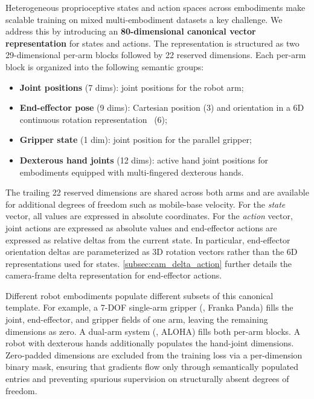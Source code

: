 Heterogeneous proprioceptive states and action spaces across embodiments make scalable training on mixed multi-embodiment datasets a key challenge.
We address this by introducing an \textbf{80-dimensional canonical vector representation} for states and actions.  
The representation is structured as two 29-dimensional per-arm blocks followed by 22 reserved dimensions.
Each per-arm block is organized into the following semantic groups:
\begin{itemize}[leftmargin=*,topsep=2pt,itemsep=1pt]
    \item \textbf{Joint positions} (7 dims): joint positions for the robot arm;
    \item \textbf{End-effector pose} (9 dims): Cartesian position (3) and orientation in a 6D continuous rotation representation~\citep{zhou2019continuity} (6);
    \item \textbf{Gripper state} (1 dim): joint position for the parallel gripper;
    \item \textbf{Dexterous hand joints} (12 dims): active hand joint positions for embodiments equipped with multi-fingered dexterous hands.
\end{itemize}
The trailing 22 reserved dimensions are shared across both arms and are available for additional degrees of freedom such as mobile-base velocity.
For the \emph{state} vector, all values are expressed in absolute coordinates.
For the \emph{action} vector, joint actions are expressed as absolute values and end-effector actions are expressed as relative deltas from the current state. In particular, end-effector orientation deltas are parameterized as 3D rotation vectors rather than the 6D representations used for states. \cref{subsec:cam_delta_action} further details the camera-frame delta representation for end-effector actions.


Different robot embodiments populate different subsets of this canonical template.
For example, a 7-DOF single-arm gripper (\eg, Franka Panda) fills the joint, end-effector, and gripper fields of one arm, leaving the remaining dimensions as zero.
A dual-arm system (\eg, ALOHA) fills both per-arm blocks. A robot with dexterous hands additionally populates the hand-joint dimensions. Zero-padded dimensions are excluded from the training loss via a per-dimension binary mask, ensuring that gradients flow only through semantically populated entries and preventing spurious supervision on structurally absent degrees of freedom.

